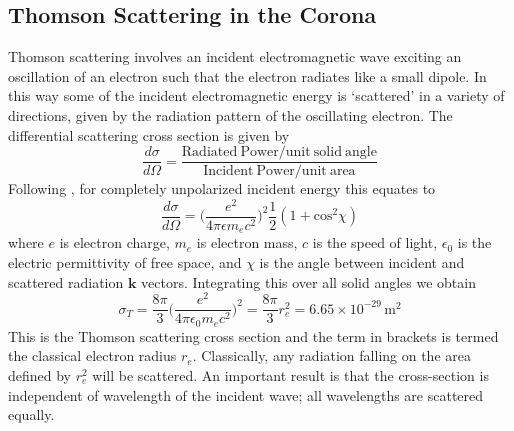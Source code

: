 \subsection{Thomson Scattering in the Corona}\label{sec:10}
\doublespacing
Thomson scattering involves an incident electromagnetic wave exciting an oscillation of an electron such that the electron radiates like a small dipole. In this way some of the incident electromagnetic energy is `scattered' in a variety of directions, given by the radiation pattern of the oscillating electron. The differential scattering cross section is given by 
\begin{equation}
\frac{d \sigma}{d \Omega} = \frac{\mathrm{Radiated~Power/unit~solid~angle}}{\mathrm{Incident~Power/unit~area}}
\end{equation}
Following \citet{jackson1975}, for completely unpolarized incident energy this equates to 
\begin{equation}
\frac{d \sigma}{d \Omega} = \bigg(\frac{e^2}{4\pi \epsilon m_ec^2}\bigg)^2\frac{1}{2}(1+\mathrm{cos}^2\chi)
\end{equation}
where $e$ is electron charge, $m_e$ is electron mass, $c$ is the speed of light, $\epsilon_0$ is the electric permittivity of free space, and $\chi$ is the angle between incident and scattered radiation $\mathbf{k}$ vectors. Integrating this over all solid angles we obtain
\begin{equation}
\sigma_T = \frac{8\pi}{3}\bigg(  \frac{e^2}{4\pi\epsilon_0 m_e c^2}   \bigg)^2 = \frac{8\pi}{3}r_e^2 = 6.65\times10^{-29}\,\mathrm{m}^2
\end{equation}
This is the Thomson scattering cross section and the term in brackets is termed the classical electron radius $r_e$. Classically, any radiation falling on the area defined by $r_e^2$ will be scattered. An important result is that the cross-section is independent of wavelength of the incident wave; all wavelengths are scattered equally. 

